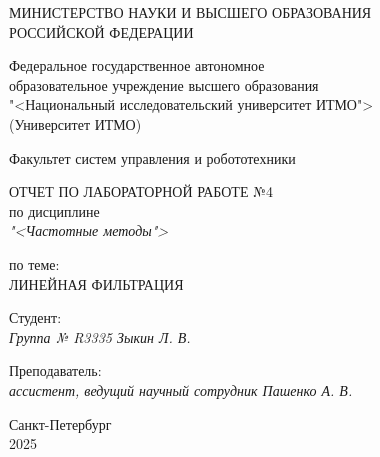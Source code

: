 \thispagestyle{empty}

\begin{center}
    МИНИСТЕРСТВО НАУКИ И ВЫСШЕГО ОБРАЗОВАНИЯ \\ РОССИЙСКОЙ ФЕДЕРАЦИИ

    \vspace{20pt}

    Федеральное государственное автономное \\ образовательное учреждение высшего образования \\
    "<Национальный исследовательский университет ИТМО"> \\
    (Университет ИТМО)

    \vspace{20pt}

    Факультет систем управления и робототехники
\end{center}

\vfill

\begin{center}
    ОТЧЕТ ПО ЛАБОРАТОРНОЙ РАБОТЕ №4\\  
    по дисциплине \\
    \textit{"<Частотные методы">}

    \vspace{20pt}

    по теме: \\
    \uppercase{Линейная фильтрация}
\end{center}

\vfill

    \noindent Студент: \\
    \textit{Группа № R3335 \hfill Зыкин Л. В.}

    \vspace{20pt}

    \noindent Преподаватель: \\
    \textit{ассистент, ведущий научный сотрудник \hfill Пашенко А. В.}

\vfill

\begin{center}
    Санкт-Петербург \\ 2025
\end{center}